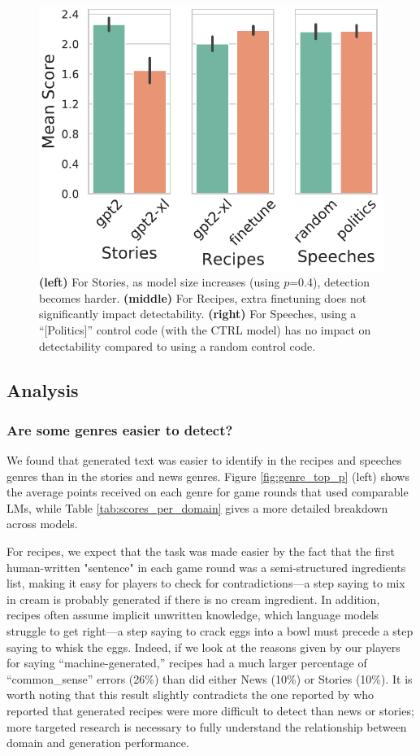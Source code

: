 \begin{figure}[tb]
    \centering
    \includegraphics[width=0.4\linewidth]{figures/model_size_and_finetuning.pdf}
    \caption{\textbf{(left)} For Stories, as model size increases (using $p$=0.4), detection becomes harder. \textbf{(middle)} For Recipes, extra finetuning does not significantly impact detectability. \textbf{(right)} For Speeches, using a ``[Politics]'' control code (with the CTRL model) has no impact on detectability compared to using a random control code.}
    \label{fig:model_size_finetuning}
\end{figure}

\subsection{Analysis}

\subsubsection{Are some genres easier to detect?}
We found that generated text was easier to identify in the recipes and speeches genres than in the stories and news genres.
Figure \ref{fig:genre_top_p} (left) shows the average points received on each genre for game rounds that used comparable LMs, while Table \ref{tab:scores_per_domain} gives a more detailed breakdown across models. 

For recipes, we expect that the task was made easier by the fact that the first human-written "sentence" in each game round was a semi-structured ingredients list, making it easy for players to check for contradictions---a step saying to mix in cream is probably generated if there is no cream ingredient.
In addition, recipes often assume implicit unwritten knowledge, which language models struggle to get right---a step saying to crack eggs into a bowl must precede a step saying to  whisk the eggs.
Indeed, if we look at the reasons given by our players for saying ``machine-generated,'' recipes had a much larger percentage of ``common\_sense'' errors (26\%) than did either News (10\%) or Stories (10\%).
It is worth noting that this result slightly contradicts the one reported by \citet{clark2021all} who reported that generated recipes were more difficult to detect than news or stories; more targeted research is necessary to fully understand the relationship between domain and generation performance.

